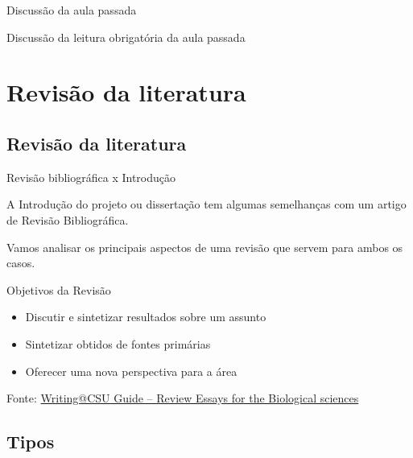 \documentclass{beamer}
\begin{document}

\begin{frame}{Discussão da aula passada}
  \begin{block}{}
    Discussão da leitura obrigatória da aula passada
  \end{block}
\end{frame}

\section{Revisão da literatura}

\subsection{Revisão da literatura}

\begin{frame}{Revisão bibliográfica x Introdução}
  \begin{block}{}
    \footnotesize
    A Introdução do projeto ou dissertação tem algumas semelhanças com
    um artigo de Revisão Bibliográfica.

    \bigskip

    Vamos analisar os principais aspectos de uma revisão que servem
    para ambos os casos.
  \end{block}
\end{frame}

\begin{frame}{Objetivos da Revisão}
  \begin{itemize}
    \footnotesize
  \item Discutir e sintetizar resultados sobre um assunto
    \bigskip
  \item Sintetizar obtidos de fontes primárias
    \bigskip
  \item Oferecer uma nova perspectiva para a área
  \end{itemize}

  \vfill
  \scriptsize
  \hfill Fonte: \href{https://writing.colostate.edu/guides/guide.cfm?guideid=79}
  {\tiny Writing@CSU Guide -- Review Essays for the Biological sciences}
\end{frame}

\subsection{Tipos}
\end{document}
